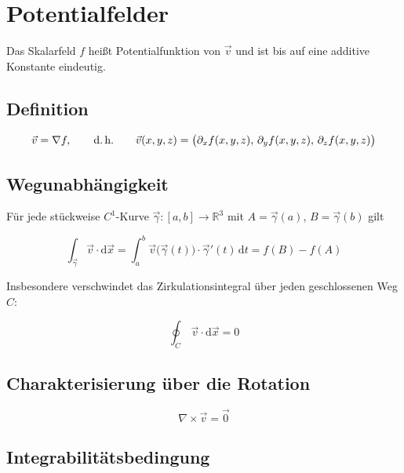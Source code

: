 \documentclass[a4paper,11pt,oneside,open=any,parskip=half, DIV=15]{scrreprt}
\begin{document}
\section{Potentialfelder}

   Das Skalarfeld \(f\) heißt Potentialfunktion von \(\vec{v}\) und ist bis auf eine additive Konstante eindeutig.
   \subsection*{Definition}
      \begin{importantbox}
         \[
            \vec{v}=\nabla f,
            \qquad\text{d.\,h.}\qquad
            \vec{v}(x,y,z)=\bigl(\partial_x f(x,y,z),\,\partial_y f(x,y,z),\,\partial_z f(x,y,z)\bigr)
         \]
      \end{importantbox}

   \subsection*{Wegunabhängigkeit}
      Für jede stückweise \(C^1\)-Kurve \(\vec{\gamma}:[a,b]\to\mathbb{R}^3\) mit \(A=\vec{\gamma}(a)\), \(B=\vec{\gamma}(b)\) gilt
      \begin{importantbox}
         \[
            \int_{\vec{\gamma}}\vec{v}\cdot \mathrm{d}\vec{x}
            =\int_a^b \vec{v}\bigl(\vec{\gamma}(t)\bigr)\cdot \vec{\gamma}'(t)\,\mathrm{d}t
            = f(B)-f(A)
         \]
      \end{importantbox}
         Insbesondere verschwindet das Zirkulationsintegral über jeden geschlossenen Weg \(C\):
      \begin{importantbox}
         \[
         \oint_{C}\,\vec{v}\cdot \mathrm{d}\vec{x}=0
         \]
      \end{importantbox}


   \subsection*{Charakterisierung über die Rotation}
   \begin{importantbox}
   \[
   \nabla\times\vec{v}=\vec{0}
   \]
   \end{importantbox}

   \subsection*{Integrabilitätsbedingung}
\end{document}
